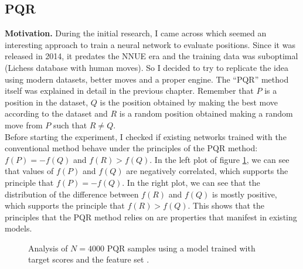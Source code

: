 \newpage
\subsection{PQR}

\textbf{Motivation.} During the initial research, I came across \cite{dlchess:2014} which seemed an interesting approach to train a neural network to evaluate positions. Since it was released in 2014, it predates the NNUE era and the training data was suboptimal (Lichess database \cite{lichessdb} with human moves). So I decided to try to replicate the idea using modern datasets, better moves and a proper engine. The \enquote{PQR} method itself was explained in detail in the previous chapter.  Remember that $P$ is a position in the dataset, $Q$ is the position obtained by making the best move according to the dataset and $R$ is a random position obtained making a random move from $P$ such that $R \neq Q$. \\

Before starting the experiment, I checked if existing networks trained with the conventional method behave under the principles of the PQR method: ${f(P) = -f(Q)}$ and ${f(R) > f(Q)}$. In the left plot of figure \ref{pqr-eval}, we can see that values of $f(P)$ and $f(Q)$ are negatively correlated, which supports the principle that $f(P)=-f(Q)$. In the right plot, we can see that the distribution of the difference between $f(R)$ and $f(Q)$ is mostly positive, which supports the principle that $f(R) > f(Q)$. This shows that the principles that the PQR method relies on are properties that manifest in existing models.

\begin{figure}[H]
\centering
{}
\caption{Analysis of $N=4000$ PQR samples using a model trained with target scores and the feature set .}
\label{pqr-eval}
\end{figure}

